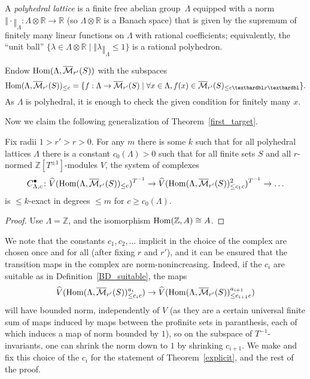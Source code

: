\begin{definition}
  \label{polyhedral_lattice}
  A \emph{polyhedral lattice} is a finite free abelian group~$\Lambda$
  equipped with a norm $‖\cdot‖_\Lambda \colon \Lambda\otimes \mathbb R\to \mathbb R$
  (so $\Lambda\otimes \mathbb R$ is a Banach space)
  that is given by the supremum of finitely many linear functions on $\Lambda$ with rational coefficients;
  equivalently, the ``unit ball''
  $\{\lambda\in \Lambda\otimes \mathbb R\mid ‖\lambda‖_\Lambda\leq 1\}$ is a rational polyhedron.
\end{definition}

Endow $\operatorname{Hom}(\Lambda,\overline{\mathcal M}_{r'}(S))$ with the subspaces
\[
\Hom(\Lambda,\overline{\mathcal M}_{r'}(S))_{\leq c} = \{f: \Lambda\to \overline{\mathcal M}_{r'}(S)\mid \forall x\in \Lambda, f(x)\in \overline{\mathcal M}_{r'}(S)_{\leq c‖x‖}\}.
\]
As $\Lambda$ is polyhedral, it is enough to check the given condition for finitely many $x$.

Now we claim the following generalization of Theorem~\ref{first_target}.

\begin{theorem}
  \label{explicit}
  Fix radii $1>r'>r>0$. For any $m$ there is some $k$
  such that for all polyhedral lattices $\Lambda$
  there is a constant $c_0(\Lambda)>0$
  such that for all finite sets $S$
  and all $r$-normed $\mathbb Z[T^{\pm 1}]$-modules $V$,
  the system of complexes
  \[
  C_{\Lambda,c}^\bullet \colon
  \widehat{V}(\operatorname{Hom}(\Lambda,\overline{\mathcal M}_{r'}(S))_{\leq c})^{T^{-1}} \to
  \widehat{V}(\operatorname{Hom}(\Lambda,\overline{\mathcal M}_{r'}(S))_{\leq c_1c}^2)^{T^{-1}} \to \ldots
  \]
  is $\leq k$-exact in degrees $\leq m$ for $c\geq c_0(\Lambda)$.
\end{theorem}

\begin{proof}
  Use $\Lambda = \mathbb Z$, and the isomorphism $\operatorname{Hom}(\mathbb Z, A) \cong A$.
\end{proof}

We note that the constants $c_1,c_2,\ldots$ implicit in the choice of the complex
are chosen once and for all (after fixing $r$ and $r'$),
and it can be ensured that the transition maps in the complex are norm-nonincreasing.
Indeed, if the $c_i$ are suitable as in Definition~\ref{BD_suitable},
the maps
\[
\widehat{V}(\operatorname{Hom}(\Lambda,\overline{\mathcal M}_{r'}(S))_{\leq c_ic}^{a_i})\to \widehat{V}(\operatorname{Hom}(\Lambda,\overline{\mathcal M}_{r'}(S))_{\leq c_{i+1}c}^{a_{i+1}})
\]
will have bounded norm, independently of $V$ (as they are a certain universal finite sum of maps induced by maps between the profinite sets in paranthesis, each of which induces a map of norm bounded by $1$), so on the subspace of $T^{-1}$-invariants, one can shrink the norm down to $1$ by shrinking $c_{i+1}$. We make and fix this choice of the $c_i$ for the statement of Theorem~\ref{explicit}, and the rest of the proof.


